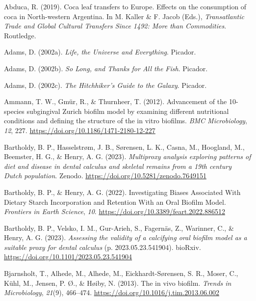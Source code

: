\documentclass[
  b5paper,
]{book}
\newlength{\cslhangindent}
\newenvironment{CSLReferences}[2] %
 {\begin{list}{}{%
  \setlength{\itemindent}{0pt}
  \setlength{\leftmargin}{0pt}
  \setlength{\parsep}{0pt}
  \ifodd #1
   \setlength{\leftmargin}{\cslhangindent}
   \setlength{\itemindent}{-1\cslhangindent}
  \fi
  \setlength{\itemsep}{#2\baselineskip}}}
 {\end{list}}
\begin{document}
\label{refs-6}
\begin{CSLReferences}{1}{0}
Abduca, R. (2019). Coca leaf transfers to {Europe}. {Effects} on the
consumption of coca in {North-western Argentina}. In M. Kaller \& F.
Jacob (Eds.), \emph{Transatlantic {Trade} and {Global Cultural Transfers
Since} 1492: {More} than {Commodities}}. {Routledge}.

Adams, D. (2002a). \emph{Life, the {Universe} and {Everything}}.
{Picador}.

Adams, D. (2002b). \emph{So {Long}, and {Thanks} for {All} the {Fish}}.
{Picador}.

Adams, D. (2002c). \emph{The {Hitchhiker}'s {Guide} to the {Galaxy}}.
{Picador}.

Ammann, T. W., Gmür, R., \& Thurnheer, T. (2012). Advancement of the
10-species subgingival {Zurich} biofilm model by examining different
nutritional conditions and defining the structure of the in vitro
biofilms. \emph{BMC Microbiology}, \emph{12}, 227.
\url{https://doi.org/10.1186/1471-2180-12-227}

Bartholdy, B. P., Hasselstrøm, J. B., Sørensen, L. K., Casna, M.,
Hoogland, M., Beemster, H. G., \& Henry, A. G. (2023). \emph{Multiproxy
analysis exploring patterns of diet and disease in dental calculus and
skeletal remains from a 19th century {Dutch} population}. {Zenodo}.
\url{https://doi.org/10.5281/zenodo.7649151}

Bartholdy, B. P., \& Henry, A. G. (2022). Investigating {Biases
Associated With Dietary Starch Incorporation} and {Retention With} an
{Oral Biofilm Model}. \emph{Frontiers in Earth Science}, \emph{10}.
\url{https://doi.org/10.3389/feart.2022.886512}

Bartholdy, B. P., Velsko, I. M., Gur-Arieh, S., Fagernäs, Z., Warinner,
C., \& Henry, A. G. (2023). \emph{Assessing the validity of a calcifying
oral biofilm model as a suitable proxy for dental calculus} (p.
2023.05.23.541904). {bioRxiv}.
\url{https://doi.org/10.1101/2023.05.23.541904}

Bjarnsholt, T., Alhede, M., Alhede, M., Eickhardt-Sørensen, S. R.,
Moser, C., Kühl, M., Jensen, P. Ø., \& Høiby, N. (2013). The in vivo
biofilm. \emph{Trends in Microbiology}, \emph{21}(9), 466--474.
\url{https://doi.org/10.1016/j.tim.2013.06.002}


\end{CSLReferences}
\end{document}
